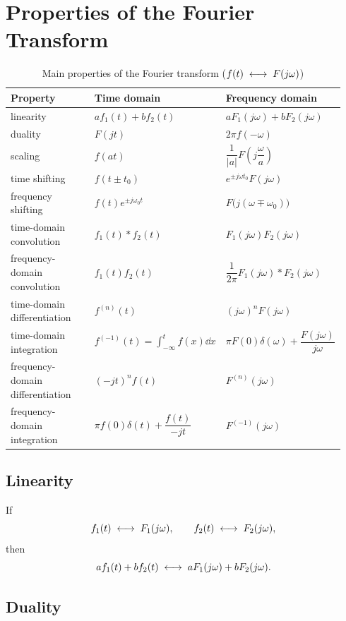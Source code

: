 \section{Properties of the Fourier Transform}

\begin{table}[htbp]
\centering
\caption{Main properties of the Fourier transform
($f(t)\;\longleftrightarrow\; F(j\omega)$)}
\small
\begin{tabular}{@{}p{0.26\linewidth}p{0.34\linewidth}p{0.34\linewidth}@{}}
\toprule
Property & Time domain & Frequency domain \\
\midrule
linearity & $af_1(t)+bf_2(t)$ & $aF_1(j\omega)+bF_2(j\omega)$ \\
duality & $F(jt)$ & $2\pi f(-\omega)$ \\
scaling & $f(at)$ & $\dfrac{1}{|a|}F\!\left(j\dfrac{\omega}{a}\right)$ \\
time shifting & $f(t\pm t_0)$ & $e^{\pm j\omega t_0}F(j\omega)$ \\
frequency shifting & $f(t)e^{\pm j\omega_0 t}$ & $F\bigl(j(\omega\mp\omega_0)\bigr)$ \\
time-domain convolution & $f_1(t)*f_2(t)$ & $F_1(j\omega)F_2(j\omega)$ \\
frequency-domain convolution & $f_1(t)f_2(t)$ & $\dfrac{1}{2\pi}F_1(j\omega)*F_2(j\omega)$ \\
time-domain differentiation & $f^{(n)}(t)$ & $(j\omega)^{n}F(j\omega)$ \\
time-domain integration & $f^{(-1)}(t)=\displaystyle\int_{-\infty}^{t}f(x)\dd x$
         & $\pi F(0)\delta(\omega)+\dfrac{F(j\omega)}{j\omega}$ \\
frequency-domain differentiation & $(-jt)^{n}f(t)$ & $F^{(n)}(j\omega)$ \\
frequency-domain integration & $\pi f(0)\delta(t)+\dfrac{f(t)}{-jt}$ & $F^{(-1)}(j\omega)$ \\
\bottomrule
\end{tabular}
\end{table}

\subsection{Linearity}

If
\[
    f_1(t)\;\longleftrightarrow\; F_1(j\omega),\qquad f_2(t)\;\longleftrightarrow\; F_2(j\omega),
\]
then
\[
    af_1(t)+bf_2(t)\;\longleftrightarrow\; aF_1(j\omega)+bF_2(j\omega).
\]

\subsection{Duality}

